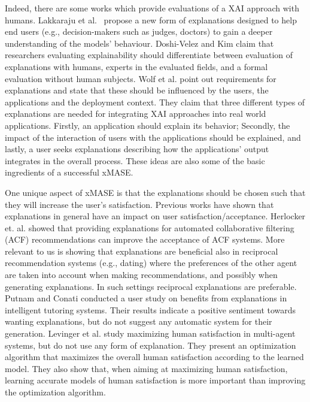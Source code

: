 \documentclass[letterpaper]{article} %
\begin{document}
Indeed, there are some works which provide evaluations of a \ac{XAI} approach with humans. 
Lakkaraju et al.~ propose a new form of explanations designed to help end users (e.g., decision-makers such as judges, doctors) to gain a deeper understanding of the models' behaviour. 
Doshi-Velez and Kim  claim that researchers evaluating explainability should differentiate between evaluation of explanations with humans, experts in the evaluated fields, and a formal evaluation without human subjects. 
Wolf et al.  point out requirements for explanations and state that these should be influenced by the users, the applications and the deployment context. 
They claim that three different types of explanations are needed for integrating \ac{XAI} approaches into real world applications. Firstly, an application should explain its behavior; Secondly, the impact of the interaction of users with the  applications should be explained, and lastly, a user seeks explanations describing how the applications' output integrates in the overall process. These ideas are also some of the basic ingredients of a successful \ac{xMASE}.

One unique aspect of \ac{xMASE} is that the explanations should be chosen such that they will increase the user's satisfaction. Previous works have shown that explanations in general have an impact on user satisfaction/acceptance. Herlocker et. al.  showed that providing explanations
for automated collaborative filtering (ACF) recommendations can improve the acceptance of ACF systems.
More relevant to us is \cite{kleinerman2018providing} showing that explanations are beneficial also in reciprocal recommendation systems (e.g., dating) where the preferences of the other agent are taken into account when making recommendations, and possibly when generating explanations. In such settings reciprocal explanations are preferable.  
Putnam and Conati  conducted a user study on benefits from  explanations in intelligent tutoring systems. Their results indicate a positive sentiment towards wanting explanations, but do not suggest any automatic system for their generation.
%
Levinger et al.  study maximizing human satisfaction in multi-agent systems, but do not use any form of explanation. They present an optimization algorithm that maximizes the overall human satisfaction according to the learned model. They also show that, when aiming at maximizing human satisfaction, learning accurate models of human satisfaction is more important than improving the optimization algorithm. 
\end{document}
